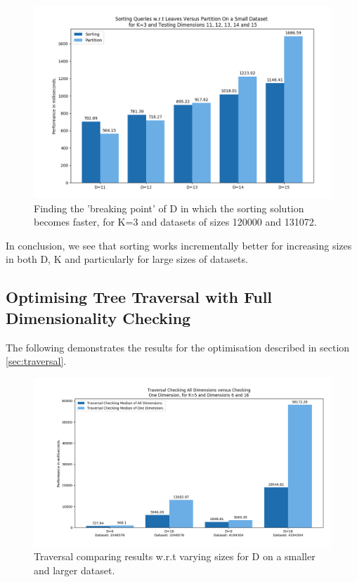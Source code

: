 \begin{figure}[H]
\centering
\includegraphics[width=1\textwidth]{pics/plot-figs/sort-mult-d-big.png}
\caption{Finding the 'breaking point' of D in which the sorting solution becomes faster, for K=3 and datasets of sizes 120000 and 131072.}
\label{fig:sort3}
\end{figure}


In conclusion, we see that sorting works incrementally better for increasing sizes in both D, K and particularly for large sizes of datasets. 


\subsection{Optimising Tree Traversal with Full Dimensionality Checking}

The following demonstrates the results for the optimisation described in section \ref{sec:traversal}. 


\begin{figure}[H]
\centering
\includegraphics[width=1\textwidth]{pics/plot-figs/trav-k5-no-1.png}
\caption{Traversal comparing results w.r.t varying sizes for D on a smaller and larger dataset.}
\label{fig:trav1}
\end{figure}

